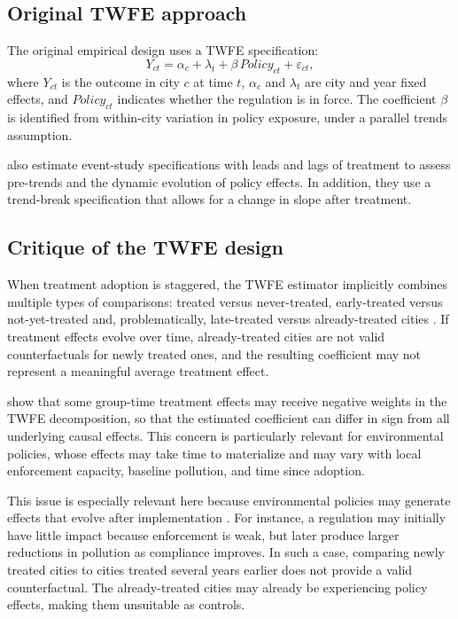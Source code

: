 \documentclass[10pt]{article}
\begin{document}
\subsection{Original TWFE approach}

The original empirical design uses a TWFE specification:
\begin{equation}\label{eq:twfe}
Y_{ct} = \alpha_c + \lambda_t + \beta \, Policy_{ct} + \varepsilon_{ct},
\end{equation}
where $Y_{ct}$ is the outcome in city $c$ at time $t$, $\alpha_c$ and $\lambda_t$ are city and year fixed effects, and $Policy_{ct}$ indicates whether the regulation is in force. The coefficient $\beta$ is identified from within-city variation in policy exposure, under a parallel trends assumption.

\citet{greenstone2014} also estimate event-study specifications with leads and lags of treatment to assess pre-trends and the dynamic evolution of policy effects. In addition, they use a trend-break specification that allows for a change in slope after treatment.

\subsection{Critique of the TWFE design}

When treatment adoption is staggered, the TWFE estimator implicitly combines multiple types of comparisons: treated versus never-treated, early-treated versus not-yet-treated and, problematically, late-treated versus already-treated cities \citep{goodman2021}. If treatment effects evolve over time, already-treated cities are not valid counterfactuals for newly treated ones, and the resulting coefficient may not represent a meaningful average treatment effect.

\citet{dechaisemartin2023} show that some group-time treatment effects may receive negative weights in the TWFE decomposition, so that the estimated coefficient can differ in sign from all underlying causal effects. This concern is particularly relevant for environmental policies, whose effects may take time to materialize and may vary with local enforcement capacity, baseline pollution, and time since adoption. 

This issue is especially relevant here because environmental policies may generate effects that evolve after implementation \cite{dechaisemartin2023}. For instance, a regulation may initially have little impact because enforcement is weak, but later produce larger reductions in pollution as compliance improves. In such a case, comparing newly treated cities to cities treated several years earlier does not provide a valid counterfactual. The already-treated cities may already be experiencing policy effects, making them unsuitable as controls.
\end{document}
